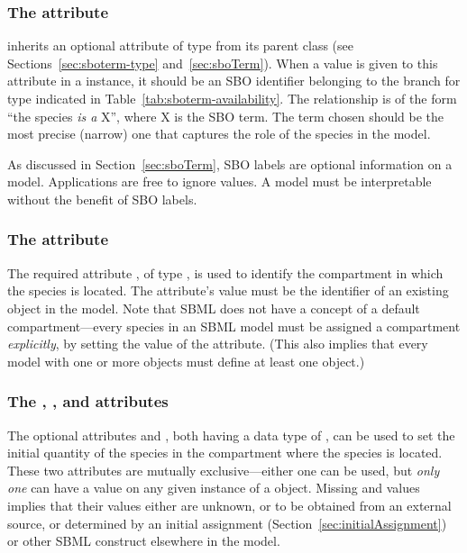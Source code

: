 \subsubsection{The  attribute}
\label{sec:species-sboterm}

\Species inherits an optional 
attribute of type  from its parent
class \SBase (see Sections~\ref{sec:sboterm-type}
and~\ref{sec:sboTerm}).  When a value is given to this
attribute in a \Species instance, it should be an
SBO identifier belonging to the branch for type \Species 
indicated in Table~\ref{tab:sboterm-availability}.  The relationship is
of the form ``the species \emph{is a} X'', where X is
the SBO term.  The term chosen should be the most precise (narrow)
one that captures the role of the species in the model.

As discussed in Section~\ref{sec:sboTerm}, SBO labels are optional
information on a model.  Applications are free to ignore
 values.  A model must be interpretable without the
benefit of SBO labels.


\subsubsection{The  attribute}
\label{sec:species-compartment}

The required attribute , of type
, is used to identify the compartment in which
the species is located.  The attribute's value must be the
identifier of an existing \Compartment object in the model.  Note
that SBML does not have a concept of a default compartment---every
species in an SBML model must be assigned a compartment
\emph{explicitly}, by setting the value of the 
attribute.  (This also implies that every model with one or more
\Species objects must define at least one \Compartment object.)


\subsubsection{The ,
  , and  attributes}
\label{sec:initialAmount}

The optional attributes  and
, both having a data type of
, can be used to set the initial quantity of the
species in the compartment where the species is located.  These
two attributes are mutually exclusive---either one can be used,
but \emph{only one} can have a value on any given instance of a
\Species object.  Missing  and
 values implies that their values
either are unknown, or to be obtained from an external source, or
determined by an initial assignment
(Section~\ref{sec:initialAssignment}) or other SBML construct
elsewhere in the model.

